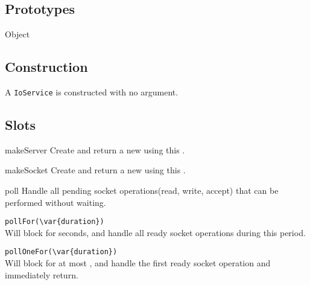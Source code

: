 \subsection{Prototypes}
\begin{refObjects}
\item[Object]
\end{refObjects}

\subsection{Construction}

A \lstinline|IoService| is constructed with no argument.

\subsection{Slots}

\begin{urbiscriptapi}
\item[makeServer]
  Create and return a new  using this .

\item[makeSocket]
  Create and return a new  using this .

\item[poll]
  Handle all pending socket operations(read, write, accept) that can be
  performed without waiting.

\item \lstinline|pollFor(\var{duration})|\\
  Will block for  seconds, and handle all ready socket operations
  during this period.

\item \lstinline|pollOneFor(\var{duration})|\\
  Will block for at most , and handle the first ready socket
  operation and immediately return.

\end{urbiscriptapi}

